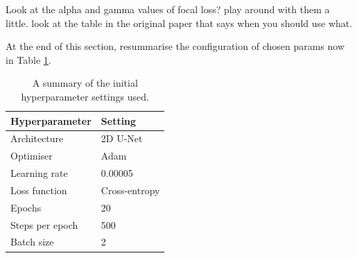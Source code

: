 



Look at the alpha and gamma values of focal loss? play around with them a little. look at the table in the original paper that says when you should use what.

At the end of this section, resummarise the configuration of chosen params now in Table \ref{tab:hyperparams1}.

\begin{table}[t]
    \centering
    \caption{A summary of the initial hyperparameter settings used.}
    \begin{tabular}{@{}ll@{}}
    \toprule
    Hyperparameter   & Setting      \\ \midrule
    Architecture     & 2D U-Net   \\
    Optimiser & Adam \\
    Learning rate & 0.00005 \\
    Loss function & Cross-entropy \\
    Epochs & 20 \\
    Steps per epoch & 500 \\
    Batch size & 2 \\ \bottomrule
    \end{tabular}
    \label{tab:hyperparams1}
\end{table}

